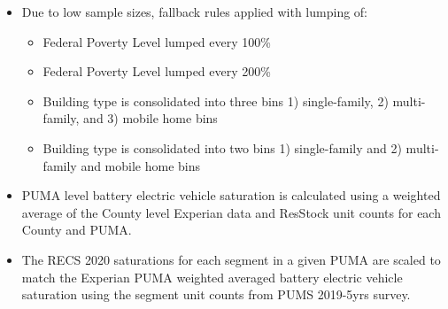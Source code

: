 \begin{itemize}
\item Due to low sample sizes, fallback rules applied with lumping of:
  \begin{itemize}
  \item [1] Federal Poverty Level lumped every 100\%
  \item [2] Federal Poverty Level lumped every 200\%
  \item [3] Building type is consolidated into three bins 1) single-family, 2) multi-family, and 3) mobile home bins
  \item [4] Building type is consolidated into two bins 1) single-family and 2) multi-family and mobile home bins
  \end{itemize}
\item PUMA level battery electric vehicle saturation is calculated using a weighted average of the County level Experian data and ResStock unit counts for each County and PUMA.
\item The RECS 2020 saturations for each segment in a given PUMA are scaled to match the Experian PUMA weighted averaged battery electric vehicle saturation using the segment unit counts from PUMS 2019-5yrs survey.
\end{itemize}
